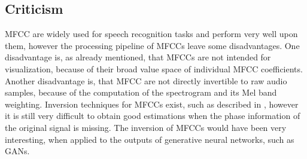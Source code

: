 
\subsection{Criticism}
MFCC are widely used for speech recognition tasks and perform very well upon them, however the processing pipeline of MFCCs leave some disadvantages.
One disadvantage is, as already mentioned, that MFCCs are not intended for visualization, because of their broad value space of individual MFCC coefficients.
Another disadvantage is, that MFCC are not directly invertible to raw audio samples, because of the computation of the spectrogram and its Mel band weighting.
Inversion techniques for MFCCs exist, such as described in \cite{Boucheron2008}, however it is still very difficult to obtain good estimations when the phase information of the original signal is missing.
The inversion of MFCCs would have been very interesting, when applied to the outputs of generative neural networks, such as GANs.